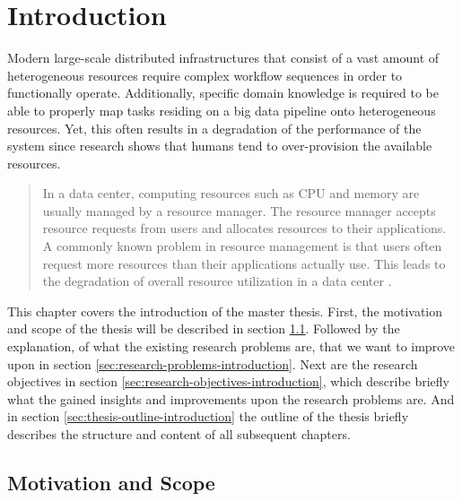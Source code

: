 \chapter{Introduction}
\label{ch:introduction}

    Modern large-scale distributed infrastructures that consist of a vast amount of heterogeneous resources require complex workflow sequences in order to functionally operate. Additionally, specific domain knowledge is required to be able to properly map tasks residing on a big data pipeline onto heterogeneous resources. Yet, this often results in a degradation of the performance of the system since research shows that humans tend to over-provision the available resources.

    \begin{quote}
        In a data center, computing resources such as CPU and memory are usually managed by a resource manager. The resource manager accepts resource requests from users and allocates resources to their applications. A commonly known problem in resource management is that users often request more resources than their applications actually use. This leads to the degradation of overall resource utilization in a data center \cite{thonglekImprovingResourceUtilization2019}.
    \end{quote}

    This chapter covers the introduction of the master thesis.
    First, the motivation and scope of the thesis will be described in section \ref{sec:motivation-and-scope-introduction}.
    Followed by the explanation, of what the existing research problems are, that we want to improve upon in section \ref{sec:research-problems-introduction}. Next are the research objectives in section \ref{sec:research-objectives-introduction}, which describe briefly what the gained insights and improvements upon the research problems are. And in section \ref{sec:thesis-outline-introduction} the outline of the thesis briefly describes the structure and content of all subsequent chapters.

        \section{Motivation and Scope}
        \label{sec:motivation-and-scope-introduction}

